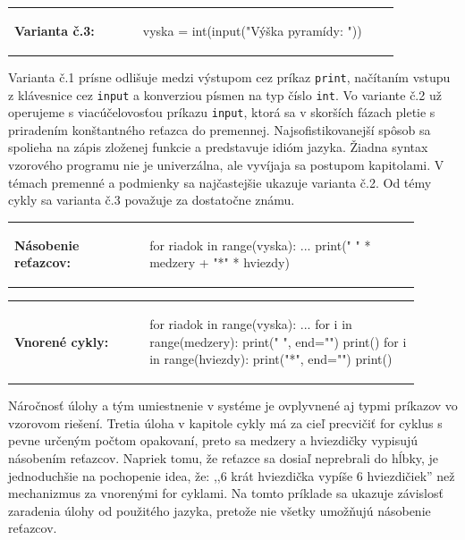 \vspace{-2em}
\begin{tabular}{@{}p{0.3\linewidth}p{0.6\linewidth}}
\textbf{\small Varianta č.3:} &
\vspace{-1em}
\begin{solution}
vyska = int(input("Výška pyramídy: "))
\end{solution}
\end{tabular}

Varianta č.1 prísne odlišuje medzi výstupom cez príkaz \verb|print|, načítaním vstupu z klávesnice cez \verb|input| a konverziou písmen na typ číslo \verb|int|. Vo variante č.2 už operujeme s viacúčelovosťou príkazu \verb|input|, ktorá sa v skorších fázach pletie s priradením konštantného reťazca do premennej. Najsofistikovanejší spôsob sa spolieha na zápis zloženej funkcie a predstavuje idióm jazyka. Žiadna syntax vzorového programu nie je univerzálna, ale vyvíjaja sa postupom kapitolami. V témach premenné a podmienky sa najčastejšie ukazuje varianta č.2. Od témy cykly sa varianta č.3 považuje za dostatočne známu.

\begin{tabular}{@{}p{0.3\linewidth}p{0.6\linewidth}}
\textbf{\small Násobenie reťazcov:} &
\vspace{-1em}
\begin{solution}
for riadok in range(vyska):
	...
	print(" " * medzery + "*" * hviezdy)
\end{solution}
\end{tabular}

\vspace{-2em}
\begin{tabular}{@{}p{0.3\linewidth}p{0.6\linewidth}}
\textbf{\small Vnorené cykly:} &
\vspace{-1em}
\begin{solution}
for riadok in range(vyska):
	...
	for i in range(medzery):
		print(" ", end="")
	print()
	for i in range(hviezdy):
		print("*", end="")
	print()
\end{solution}
\end{tabular}

Náročnosť úlohy a tým umiestnenie v systéme je ovplyvnené aj typmi príkazov vo vzorovom riešení. Tretia úloha v kapitole cykly má za cieľ precvičiť for cyklus s pevne určeným počtom opakovaní, preto sa medzery a hviezdičky vypisujú násobením reťazcov. Napriek tomu, že reťazce sa dosiaľ neprebrali do hĺbky, je jednoduchšie na pochopenie idea, že: ,,6 krát hviezdička vypíše 6 hviezdičiek'' než mechanizmus za vnorenými for cyklami. Na tomto príklade sa ukazuje závislosť zaradenia úlohy od použitého jazyka, pretože nie všetky umožňujú násobenie reťazcov.

